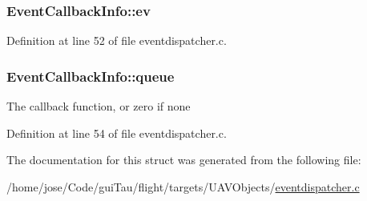 \hypertarget{struct_event_callback_info_a437283aa345859ce2746a744069f63a5}{
\subsubsection[{ev}]{ Event\-Callback\-Info\-::ev}}\label{struct_event_callback_info_a437283aa345859ce2746a744069f63a5}


Definition at line 52 of file eventdispatcher.\-c.

\hypertarget{struct_event_callback_info_a4caebba9d1c6e9e5e4c7194cec8c60a3}{
\subsubsection[{queue}]{ Event\-Callback\-Info\-::queue}}\label{struct_event_callback_info_a4caebba9d1c6e9e5e4c7194cec8c60a3}
The callback function, or zero if none 

Definition at line 54 of file eventdispatcher.\-c.



The documentation for this struct was generated from the following file\-:\begin{DoxyCompactItemize}
\item 
/home/jose/\-Code/gui\-Tau/flight/targets/\-U\-A\-V\-Objects/\hyperlink{eventdispatcher_8c}{eventdispatcher.\-c}\end{DoxyCompactItemize}
